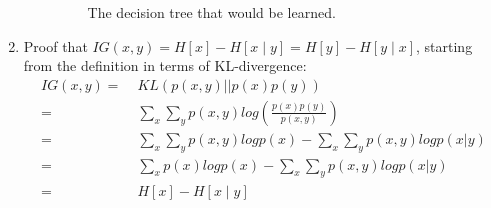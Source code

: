\begin{enumerate}
\begin{enumerate}
\begin{figure}[H]
      \caption{The decision tree that would be learned.}
      \label{fig:decision_tree}
    \end{figure}
  \end{enumerate}

\item Proof that $IG(x,y)=H[x]-H[x\mid y]=H[y]-H[y\mid x]$, starting from
the definition in terms of KL-divergence: \begin{align*}
IG(x,y)= & \; KL\left(p(x,y)||p(x)p(y)\right)\\
= & \;\sum_{x}\sum_{y}p(x,y)log(\frac{p(x)p(y)}{p(x,y)})\\
= & \;\sum_{x}\sum_{y}p(x,y)logp(x)-\sum_{x}\sum_{y}p(x,y)logp(x|y)\\
= & \;\sum_{x}p(x)logp(x)-\sum_{x}\sum_{y}p(x,y)logp(x|y)\\
= & \; H[x]-H[x\mid y]\end{align*}
\end{enumerate}
